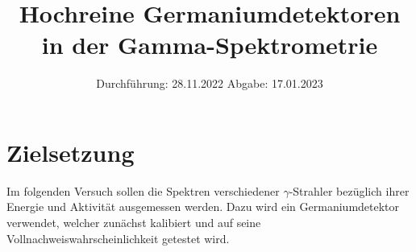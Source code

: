 

\subject{V18}
\title{Hochreine Germaniumdetektoren in der Gamma-Spektrometrie}
\date{
    Durchführung: 28.11.2022
     \hspace{3em}
    Abgabe: 17.01.2023
}


\maketitle
\thispagestyle{empty}
\tableofcontents
\newpage

\section{Zielsetzung}

    Im folgenden Versuch sollen die Spektren verschiedener $\gamma$-Strahler bezüglich ihrer Energie und Aktivität ausgemessen werden.
    Dazu wird ein Germaniumdetektor verwendet,
    welcher zunächst kalibiert und auf seine Vollnachweiswahrscheinlichkeit getestet wird.


\clearpage


\clearpage


\clearpage


\clearpage

\printbibliography


